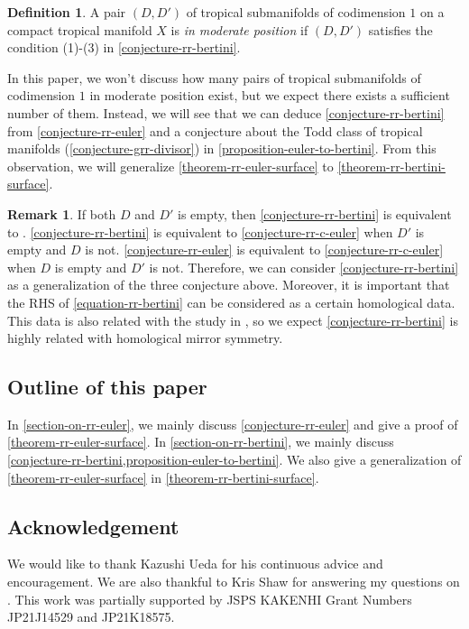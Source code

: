 \documentclass[a4paper,dvipdfmx,reqno,12pt]{amsart}
\theoremstyle{definition}
\newtheorem{definition}[theorem]{Definition}
\newtheorem{remark}[theorem]{Remark}
\numberwithin{equation}{section}
\begin{document}
\begin{definition}
A pair $(D,D')$ of tropical submanifolds of codimension 
$1$ on a compact tropical manifold $X$ is 
\emph{in moderate position} if $(D,D')$ satisfies
the condition (1)-(3) in \cref{conjecture-rr-bertini}.
\end{definition}
In this paper, we won't discuss how many pairs of 
tropical submanifolds of codimension $1$ in moderate position
exist,
but we expect there exists a sufficient number of them.
Instead, we will see that we can deduce
\cref{conjecture-rr-bertini} from \cref{conjecture-rr-euler}
and a conjecture about the Todd class of tropical 
manifolds (\cref{conjecture-grr-divisor})
in \cref{proposition-euler-to-bertini}.
From this observation, we will
generalize \cref{theorem-rr-euler-surface}
to \cref{theorem-rr-bertini-surface}.
\begin{remark}
If both $D$ and $D'$ is empty, then
\cref{conjecture-rr-bertini} is equivalent to
\cite[Conjecture 6.13]{demedrano2023chern}.
\cref{conjecture-rr-bertini} is equivalent to
\cref{conjecture-rr-c-euler} when 
$D'$ is empty and $D$ is not.
\cref{conjecture-rr-euler} is 
equivalent to
\cref{conjecture-rr-c-euler} when 
$D$ is empty and $D'$ is not.
Therefore, we can consider 
\cref{conjecture-rr-bertini} as a generalization
of the three conjecture above.
Moreover, it is important that 
the RHS of \eqref{equation-rr-bertini} 
can be considered as a certain homological data.
This data is also related with the study in 
\cite{tsutsui2023graded}, so we expect 
\cref{conjecture-rr-bertini} is highly related
with homological mirror symmetry.
\end{remark}

\subsection{Outline of this paper}
In \cref{section-on-rr-euler}, we mainly
discuss \cref{conjecture-rr-euler} and
give a proof of \cref{theorem-rr-euler-surface}.
In \cref{section-on-rr-bertini}, we mainly
discuss \cref{conjecture-rr-bertini,proposition-euler-to-bertini}.
We also give a generalization of
\cref{theorem-rr-euler-surface} in \cref{theorem-rr-bertini-surface}.

\subsection*{Acknowledgement}
We would like to thank Kazushi Ueda for his continuous advice
and encouragement. We are also thankful to Kris Shaw
for answering my questions on
\cite{shaw2015tropical,demedrano2023chern}.
This work was partially supported 
by JSPS KAKENHI Grant Numbers JP21J14529 and JP21K18575.
\end{document}
